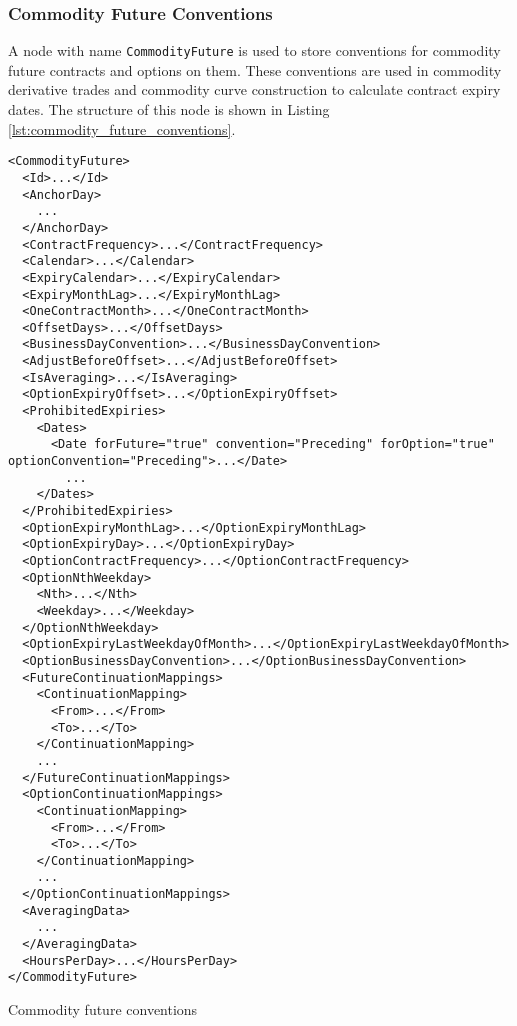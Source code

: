 \subsubsection{Commodity Future Conventions}
\label{sec:commodity_future_conventions}
A node with name \lstinline!CommodityFuture! is used to store conventions for commodity future contracts and options on them. These conventions are used in commodity derivative trades and commodity curve construction to calculate contract expiry dates. The structure of this node is shown in Listing \ref{lst:commodity_future_conventions}.

\begin{listing}[h!]
\begin{verbatim}
<CommodityFuture>
  <Id>...</Id>
  <AnchorDay>
    ...
  </AnchorDay>
  <ContractFrequency>...</ContractFrequency>
  <Calendar>...</Calendar>
  <ExpiryCalendar>...</ExpiryCalendar>
  <ExpiryMonthLag>...</ExpiryMonthLag>
  <OneContractMonth>...</OneContractMonth>
  <OffsetDays>...</OffsetDays>
  <BusinessDayConvention>...</BusinessDayConvention>
  <AdjustBeforeOffset>...</AdjustBeforeOffset>
  <IsAveraging>...</IsAveraging>
  <OptionExpiryOffset>...</OptionExpiryOffset>
  <ProhibitedExpiries>
    <Dates>
      <Date forFuture="true" convention="Preceding" forOption="true" optionConvention="Preceding">...</Date>
        ...
    </Dates>
  </ProhibitedExpiries>
  <OptionExpiryMonthLag>...</OptionExpiryMonthLag>
  <OptionExpiryDay>...</OptionExpiryDay>
  <OptionContractFrequency>...</OptionContractFrequency>
  <OptionNthWeekday>
    <Nth>...</Nth>
    <Weekday>...</Weekday>
  </OptionNthWeekday>
  <OptionExpiryLastWeekdayOfMonth>...</OptionExpiryLastWeekdayOfMonth>
  <OptionBusinessDayConvention>...</OptionBusinessDayConvention>
  <FutureContinuationMappings>
    <ContinuationMapping>
      <From>...</From>
      <To>...</To>
    </ContinuationMapping>
    ...
  </FutureContinuationMappings>
  <OptionContinuationMappings>
    <ContinuationMapping>
      <From>...</From>
      <To>...</To>
    </ContinuationMapping>
    ...
  </OptionContinuationMappings>
  <AveragingData>
    ...
  </AveragingData>
  <HoursPerDay>...</HoursPerDay>
</CommodityFuture>
\end{verbatim}
\caption{Commodity future conventions}
\label{lst:commodity_future_conventions}
\end{listing}

